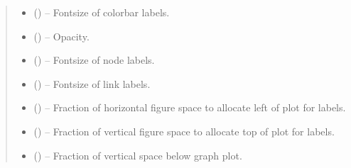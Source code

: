 \documentclass[letterpaper,10pt,english]{sphinxmanual}
\begin{document}
\begin{fulllineitems}
\begin{quote}
\begin{description}
\begin{itemize}
\item {} 
 (\sphinxstyleliteralemphasis{, }\sphinxstyleliteralemphasis{ (}\sphinxstyleliteralemphasis{)}\sphinxstyleliteralemphasis{}) -- Fontsize of colorbar labels.

\item {} 
 (\sphinxstyleliteralemphasis{, }\sphinxstyleliteralemphasis{ (}\sphinxstyleliteralemphasis{)}\sphinxstyleliteralemphasis{}) -- Opacity.

\item {} 
 (\sphinxstyleliteralemphasis{, }\sphinxstyleliteralemphasis{ (}\sphinxstyleliteralemphasis{)}\sphinxstyleliteralemphasis{}) -- Fontsize of node labels.

\item {} 
 (\sphinxstyleliteralemphasis{, }\sphinxstyleliteralemphasis{ (}\sphinxstyleliteralemphasis{)}\sphinxstyleliteralemphasis{}) -- Fontsize of link labels.

\item {} 
 (\sphinxstyleliteralemphasis{, }\sphinxstyleliteralemphasis{ (}\sphinxstyleliteralemphasis{)}\sphinxstyleliteralemphasis{}) -- Fraction of horizontal figure space to allocate left of plot for labels.

\item {} 
 (\sphinxstyleliteralemphasis{, }\sphinxstyleliteralemphasis{ (}\sphinxstyleliteralemphasis{)}\sphinxstyleliteralemphasis{}) -- Fraction of vertical figure space to allocate top of plot for labels.

\item {} 
 (\sphinxstyleliteralemphasis{, }\sphinxstyleliteralemphasis{ (}\sphinxstyleliteralemphasis{)}\sphinxstyleliteralemphasis{}) -- Fraction of vertical space below graph plot.

\end{itemize}

\end{description}\end{quote}

\end{fulllineitems}
\end{document}
